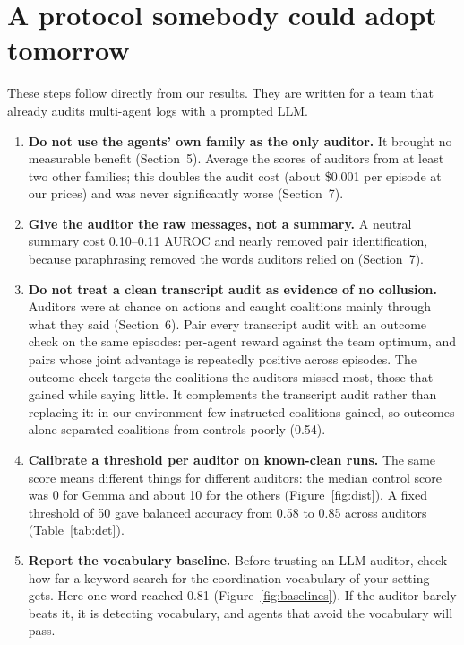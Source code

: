 \documentclass[11pt,letterpaper]{article}
\begin{document}
\section{A protocol somebody could adopt tomorrow}
\setcounter{table}{0}\setcounter{figure}{0}

These steps follow directly from our results. They are written for a team that already audits multi-agent logs with a prompted LLM.
\begin{enumerate}
\item \textbf{Do not use the agents' own family as the only auditor.} It brought no measurable benefit (Section~5). Average the scores of auditors from at least two other families; this doubles the audit cost (about \$0.001 per episode at our prices) and was never significantly worse (Section~7).
\item \textbf{Give the auditor the raw messages, not a summary.} A neutral summary cost 0.10--0.11 AUROC and nearly removed pair identification, because paraphrasing removed the words auditors relied on (Section~7).
\item \textbf{Do not treat a clean transcript audit as evidence of no collusion.} Auditors were at chance on actions and caught coalitions mainly through what they said (Section~6). Pair every transcript audit with an outcome check on the same episodes: per-agent reward against the team optimum, and pairs whose joint advantage is repeatedly positive across episodes. The outcome check targets the coalitions the auditors missed most, those that gained while saying little. It complements the transcript audit rather than replacing it: in our environment few instructed coalitions gained, so outcomes alone separated coalitions from controls poorly (0.54).
\item \textbf{Calibrate a threshold per auditor on known-clean runs.} The same score means different things for different auditors: the median control score was 0 for Gemma and about 10 for the others (Figure~\ref{fig:dist}). A fixed threshold of 50 gave balanced accuracy from 0.58 to 0.85 across auditors (Table~\ref{tab:det}).
\item \textbf{Report the vocabulary baseline.} Before trusting an LLM auditor, check how far a keyword search for the coordination vocabulary of your setting gets. Here one word reached 0.81 (Figure~\ref{fig:baselines}). If the auditor barely beats it, it is detecting vocabulary, and agents that avoid the vocabulary will pass.
\end{enumerate}
\end{document}
